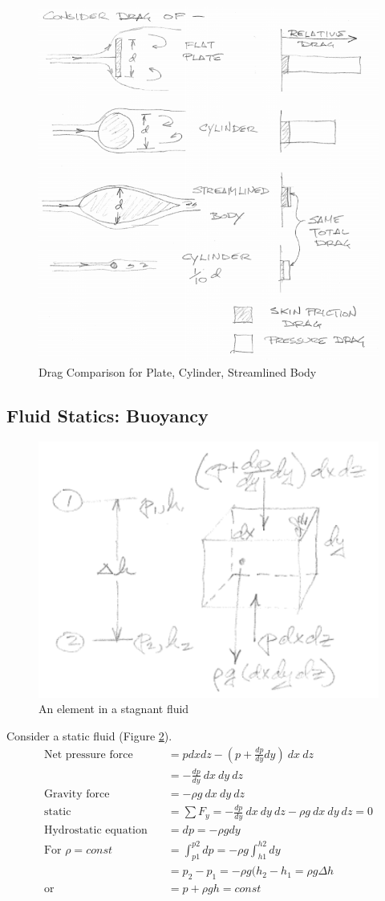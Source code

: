\documentclass[draft=false, titlepage]{article}
\begin{document}
\begin{figure}[ht]
    \centering
    \includegraphics[width=0.8\linewidth]{Figures/drag_comparison.PNG}
    \caption{Drag Comparison for Plate, Cylinder, Streamlined Body}
    \label{fig:drag_comparison}
\end{figure}

\subsection{Fluid Statics: Buoyancy}
\begin{figure}[ht]
    \centering
    \includegraphics[width=0.5\linewidth]{Figures/staticElement.PNG}
    \caption{An element in a stagnant fluid}
    \label{fig:staticElement}
\end{figure}
Consider a static fluid (Figure \ref{fig:staticElement}).
\begin{align*}
    \text{Net pressure force} \quad&= pdxdz - (p + \frac{dp}{dy} dy)\ dx\ dz\\
    &= -\frac{dp}{dy}\ dx\ dy\ dz\\
    \text{Gravity force} \quad&= -\rho  g\ dx\ dy\ dz\\
    \text{static} \quad&= \sum F_y = -\frac{dp}{dy}\ dx\ dy\ dz - \rho g\ dx\ dy\ dz = 0\\
    \text{Hydrostatic equation} \quad&= dp = -\rho g dy\\
    \text{For } \rho = const \quad &= \int_{p1}^{p2} dp = -\rho g \int_{h1}^{h2} dy\\
    &= p_2 - p_1 = -\rho g(h_2 - h_1 = \rho g \Delta h\\
    \text{or} \quad&= p + \rho gh = const
\end{align*}
\end{document}
